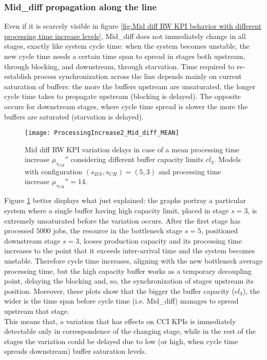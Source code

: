 \subsubsection{Mid\_diff propagation along the line}
Even if it is scarcely visible in figure \ref{fig:Mid diff RW KPI behavior with different processing time increase levels}, Mid\_diff does not immediately change in all stages, exactly like system cycle time: when the system becomes unstable, the new cycle time needs a certain time span to spread in stages both upstream, through blocking, and downstream, through starvation. Time required to re-establish process synchronization across the line depends mainly on current saturation of buffers: the more the buffers upstream are unsaturated, the longer cycle time takes to propagate upstream (blocking is delayed). The opposite occurs for downstream stages, where cycle time spread is slower the more the buffers are saturated (starvation is delayed). 
\begin{figure}[h] 
\centering
\texttt{[image: ProcessingIncrease2\_Mid\_diff\_MEAN]}
\caption[Mid diff RW KPI variation delays considering different buffer capacity limits]{Mid diff RW KPI variation delays in case of a mean processing time increase $\mu_{s_{CH}}''$ considering different buffer capacity limits $cl_3$. Models with configuration $(s_{BN},s_{CH})=(5,3)$ and processing time increase $\mu_{s_{CH}}''=14$.}
\label{fig:Mid diff RW KPI variation delays considering different buffer capacity limits}
\end{figure}
Figure \ref{fig:Mid diff RW KPI variation delays considering different buffer capacity limits} better displays what just explained: the graphs portray a particular system where a single buffer having high capacity limit, placed in stage $s=3$, is extremely unsaturated before the variation occurs. After the first stage has processed $5000$ jobs, the resource in the bottleneck stage $s=5$, positioned downstream stage $s=3$, looses production capacity and its processing time increases to the point that it exceeds inter-arrival time and the system becomes unstable. Therefore cycle time increases, aligning with the new bottleneck average processing time, but the high capacity buffer works as a temporary decoupling point, delaying the blocking and, so, the synchronization of stages upstream its position. Moreover, these plots show that the bigger the buffer capacity ($cl_3$), the wider is the time span before cycle time (i.e. Mid\_diff) manages to spread upstream that stage.\\
This means that, a variation that has effects on CCI KPIs is immediately detectable only in correspondence of the changing stage, while in the rest of the stages the variation could be delayed due to low (or high, when cycle time spreads downstream) buffer saturation levels. 
